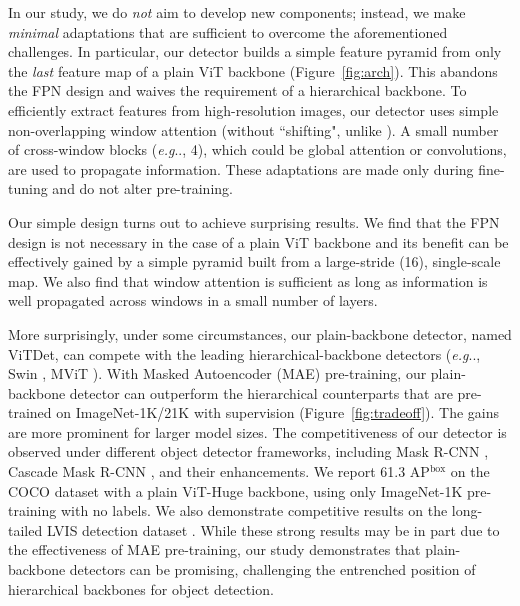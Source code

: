 \documentclass[runningheads]{llncs}
\makeatletter
\DeclareRobustCommand\onedot{\futurelet\@let@token\@onedot}
\def\@onedot{\ifx\@let@token.\else.\null\fi\xspace}
\def\eg{\emph{e.g}\onedot} \def\Eg{\emph{E.g}\onedot}
\newcommand{\boxAP}{AP$^\text{box}$\xspace}
\makeatother
\begin{document}

In our study, we do \textit{not} aim to develop new components; instead, we make \textit{minimal} adaptations that are sufficient to overcome the aforementioned challenges. In particular, our detector builds a simple feature pyramid from only the \textit{last} feature map of a plain ViT backbone (Figure~\ref{fig:arch}). This abandons the FPN design \cite{Lin2017} and waives the requirement of a hierarchical backbone. To efficiently extract features from high-resolution images, our detector uses simple non-overlapping window attention (without ``shifting", unlike \cite{Liu2021}). A small number of cross-window blocks (\eg, 4), which could be global attention \cite{Vaswani2017} or convolutions, are used to propagate information. These adaptations are made only during fine-tuning and do not alter pre-training.

Our simple design turns out to achieve surprising results. We find that the FPN design is not necessary in the case of a plain ViT backbone and its benefit can be effectively gained by a simple pyramid built from a large-stride (16), single-scale  map. We also find that window attention is sufficient as long as information is well propagated across windows in a small number of layers.

More surprisingly, under some circumstances, our plain-backbone detector, named {ViTDet}, can compete with the leading hierarchical-backbone detectors (\eg, Swin \cite{Liu2021}, MViT \cite{Fan2021,Li2021a}).
With Masked Autoencoder (MAE) \cite{He2021} pre-training, our plain-backbone detector can outperform the hierarchical counterparts that are pre-trained on ImageNet-1K/21K \cite{Deng2009} with supervision (Figure~\ref{fig:tradeoff}).
The gains are more prominent for larger model sizes. 
The competitiveness of our detector is observed under different object detector frameworks, including Mask R-CNN \cite{He2017}, Cascade Mask R-CNN \cite{Cai2019}, and their enhancements.
We report 61.3 \boxAP on the COCO dataset \cite{Lin2014} with a plain ViT-Huge backbone, using only ImageNet-1K pre-training with no labels. We also demonstrate competitive results on the long-tailed LVIS detection dataset \cite{Gupta2019}.
While these strong results may be in part due to the effectiveness of MAE pre-training, our study demonstrates that plain-backbone detectors can be promising, challenging the entrenched position of hierarchical backbones for object detection.
\end{document}
